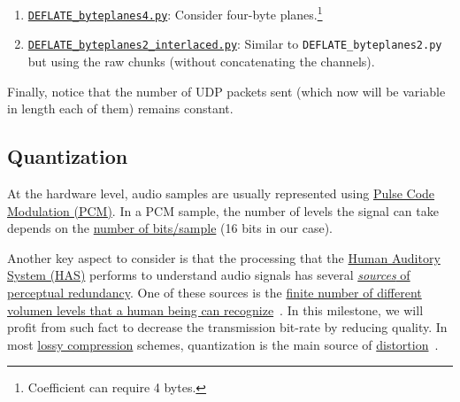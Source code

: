 \begin{enumerate}
  Similar to \verb|DEFLATE_byteplanes2.py| but considering three
  byte-planes. This would allow compression of
  \emph{coefficients}\footnote{Used in a future improvements of
  intercom.} that requires more than two bytes to be represented.
\item
  \href{https://github.com/Tecnologias-multimedia/InterCom/blob/master/src/DEFLATE\_byteplanes4.py}{\texttt{DEFLATE\_byteplanes4.py}}:
  Consider four-byte planes.\footnote{Coefficient can require 4 bytes.}
\item
  \href{https://github.com/Tecnologias-multimedia/InterCom/blob/master/src/DEFLATE_byteplanes2\_interlaced.py}{\texttt{DEFLATE\_byteplanes2\_interlaced.py}}:
  Similar to \verb|DEFLATE_byteplanes2.py| but using the raw chunks
  (without concatenating the channels).
\end{enumerate}

Finally, notice that the number of UDP packets sent (which now will be
variable in length each of them) remains constant.

\subsection{Quantization}
At the hardware level, audio samples are usually represented
using \href{https://en.wikipedia.org/wiki/Pulse-code_modulation}{Pulse
  Code Modulation (PCM)}. In a PCM sample, the number of levels
the signal can take depends on the
\href{https://en.wikipedia.org/wiki/Audio_bit_depth}{number of
  bits/sample} (16 bits in our case).

Another key aspect to consider is that the processing that the
\href{https://en.wikipedia.org/wiki/Auditory_system}{Human
  Auditory System (HAS)} performs to understand audio signals has several
\href{https://en.wikipedia.org/wiki/Psychoacoustics}{\emph{sources} of
  perceptual redundancy}. One of these sources is the
\href{https://en.wikipedia.org/wiki/Equal-loudness_contour}{finite
  number of different volumen levels that a human being can
  recognize}~\cite{bosi2003intro}. In this milestone, we will profit from
such fact to decrease the transmission bit-rate by reducing
quality. In most
\href{https://en.wikipedia.org/wiki/Lossy_compression}{lossy
  compression} schemes, quantization is the main source of
\href{https://en.wikipedia.org/wiki/Distortion}{distortion}~\cite{taubman2002jpeg2000}.

